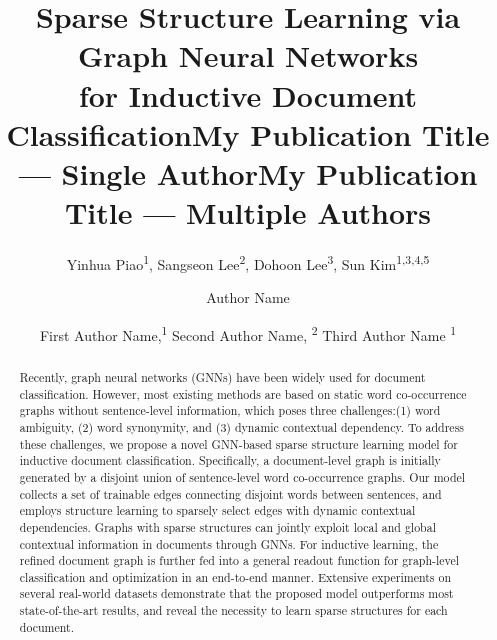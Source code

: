 \documentclass[letterpaper]{article} %
\title{Sparse Structure Learning via Graph Neural Networks\\for Inductive Document Classification}
\author{
    Yinhua Piao\textsuperscript{\rm 1},
    Sangseon Lee\textsuperscript{\rm 2},
    Dohoon Lee\textsuperscript{\rm 3},
    Sun Kim\textsuperscript{\rm 1,3,4,5}
}
\title{My Publication Title --- Single Author}
\author {
    Author Name
}
\title{My Publication Title --- Multiple Authors}
\author {
    First Author Name,\textsuperscript{\rm 1}
    Second Author Name, \textsuperscript{\rm 2}
    Third Author Name \textsuperscript{\rm 1}
}
\begin{document}
\maketitle

\begin{abstract}
Recently, graph neural networks (GNNs) have been widely used for document classification. However, most existing methods are based on static word co-occurrence graphs without sentence-level information, which poses three challenges:(1) word ambiguity, (2) word synonymity, and (3) dynamic contextual dependency. To address these challenges, we propose a novel GNN-based sparse structure learning model for inductive document classification. Specifically, a document-level graph is initially generated by a disjoint union of sentence-level word co-occurrence graphs. Our model collects a set of trainable edges connecting disjoint words between sentences, and employs structure learning to sparsely select edges with dynamic contextual dependencies. Graphs with sparse structures can jointly exploit local and global contextual information in documents through GNNs. For inductive learning, the refined document graph is further fed into a general readout function for graph-level classification and optimization in an end-to-end manner. Extensive experiments on several real-world datasets demonstrate that the proposed model outperforms most state-of-the-art results, and reveal the necessity to learn sparse structures for each document.
\end{abstract}
\end{document}
